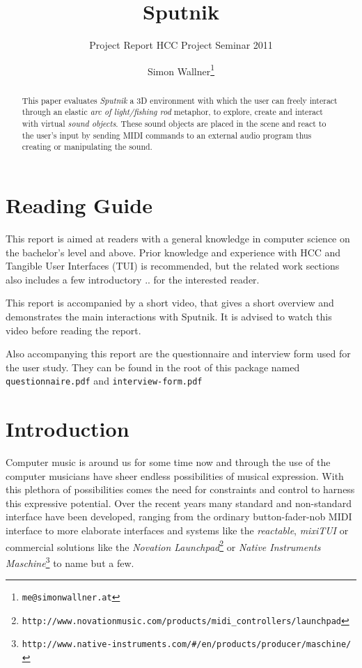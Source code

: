 \documentclass[10pt,a4paper]{scrartcl}
\title{Sputnik}
\subtitle{Project Report HCC Project Seminar 2011}
\author{Simon Wallner\footnote{\texttt{me@simonwallner.at}}}
\begin{document}
\maketitle

\begin{abstract}
This paper evaluates \emph{Sputnik} a 3D environment with which the user can freely interact through an elastic \emph{arc of light/fishing rod} metaphor, to explore, create and interact with virtual \emph{sound objects}. These sound objects are placed in the scene and react to the user's input by sending MIDI commands to an external audio program thus creating or manipulating the sound.

\end{abstract}

\section{Reading Guide}
This report is aimed at readers with a general knowledge in computer science on the bachelor's level and above. Prior knowledge and experience with HCC and Tangible User Interfaces (TUI) is recommended, but the related work sections also includes a few introductory .. for the interested reader.

This report is accompanied by a short video, that gives a short overview and demonstrates the main interactions with Sputnik. It is advised to watch this video before reading the report. 

Also accompanying this report are the questionnaire and interview form used for the user study. They can be found in the root of this package named \texttt{questionnaire.pdf} and \texttt{interview-form.pdf}


\section{Introduction}

Computer music is around us for some time now and through the use of the computer musicians have sheer endless possibilities of musical expression. With this plethora of possibilities comes the need for constraints and control to harness this expressive potential. Over the recent years many standard and non-standard interface have been developed, ranging from the ordinary button-fader-nob MIDI interface to more elaborate interfaces and systems like the \emph{reactable}\cite{Jorda2007}, \emph{mixiTUI}\cite{Pedersen2009} or commercial solutions like the \emph{Novation Launchpad}\footnote{\texttt{http://www.novationmusic.com/products/midi\_controllers/launchpad}} or \emph{Native Instruments Maschine}\footnote{\texttt{http://www.native-instruments.com/\#/en/products/producer/maschine/}} to name but a few.
\end{document}
